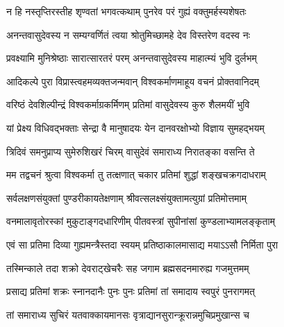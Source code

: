 

\translink{}

\storymeta



\twolineshloka
{न हि नस्तृप्तिरस्तीह शृण्वतां भगवत्कथाम्}
{पुनरेव परं गुह्यं वक्तुमर्हस्यशेषतः} %

\twolineshloka
{अनन्तवासुदेवस्य न सम्यग्वर्णितं त्वया}
{श्रोतुमिच्छामहे देव विस्तरेण वदस्व नः} %


\twolineshloka
{प्रवक्ष्यामि मुनिश्रेष्ठाः सारात्सारतरं परम्}
{अनन्तवासुदेवस्य माहात्म्यं भुवि दुर्लभम्} %

\twolineshloka
{आदिकल्पे पुरा विप्रास्त्वहमव्यक्तजन्मवान्}
{विश्वकर्माणमाहूय वचनं प्रोक्तवानिदम्} %

\twolineshloka
{वरिष्ठं देवशिल्पीन्द्रं विश्वकर्माग्रकर्मिणम्}
{प्रतिमां वासुदेवस्य कुरु शैलमयीं भुवि} %

\twolineshloka
{यां प्रेक्ष्य विधिवद्‌भक्ताः सेन्द्रा वै मानुषादयः}
{येन दानवरक्षोभ्यो विज्ञाय सुमहद्‌भयम्} %

\twolineshloka
{त्रिदिवं समनुप्राप्य सुमेरुशिखरं चिरम्}
{वासुदेवं समाराध्य निरातङ्का वसन्ति ते} %

\twolineshloka
{मम तद्वचनं श्रुत्वा विश्वकर्मा तु तत्क्षणात्}
{चकार प्रतिमां शुद्धां शङ्खचक्रगदाधराम्} %

\twolineshloka
{सर्वलक्षणसंयुक्तां पुण्डरीकायतेक्षणाम्}
{श्रीवत्सलक्ष्संयुक्तामत्युग्रां प्रतिमोत्तमाम्} %

\twolineshloka
{वनमालावृतोरस्कां मुकुटाङ्गदधारिणीम्}
{पीतवस्त्रां सुपीनांसां कुण्डलाभ्यामलङ्कृताम्} %

\twolineshloka
{एवं सा प्रतिमा दिव्या गुह्यमन्त्रैस्तदा स्वयम्}
{प्रतिष्ठाकालमासाद्य मयाऽऽसौ निर्मिता पुरा} %

\twolineshloka
{तस्मिन्काले तदा शक्रो देवराट्खेचरैः सह}
{जगाम ब्रह्मसदनमारुह्य गजमुत्तमम्} %

\twolineshloka
{प्रसाद्य प्रतिमां शक्रः स्नानदानैः पुनः पुनः}
{प्रतिमां तां समादाय स्वपुरं पुनरागमत्} %

\twolineshloka
{तां समाराध्य सुचिरं यतवाक्कायमानसः}
{वृत्राद्यानसुरान्क्रूरान्नमुचिप्रमुखान्स च} %

